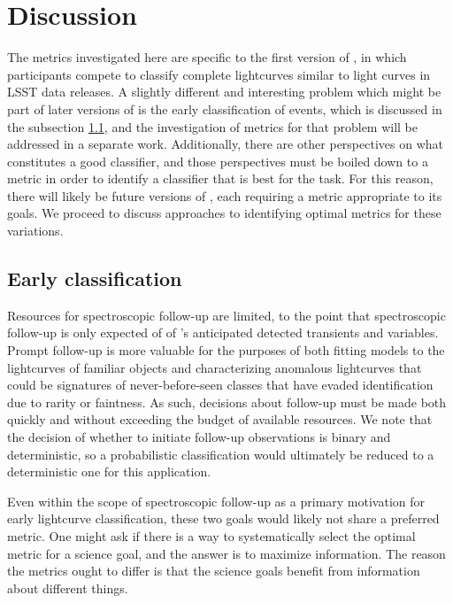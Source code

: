 \section{Discussion}
\label{sec:discussion}
The metrics investigated here are specific to the first version of \plasticc, in which participants compete to classify complete lightcurves similar to light curves in LSST data releases. A slightly different and interesting problem which might be part of later versions of \plasticc is the early classification of events, which is discussed in the subsection \ref{sec:early}, and the investigation of metrics for that problem will be addressed in a separate work.  
Additionally, there are other perspectives on what constitutes a good classifier, and those perspectives must be boiled down to a metric in order to identify a classifier that is best for the task.
For this reason, there will likely be future versions of \plasticc, each requiring a metric appropriate to its goals.
We proceed to discuss approaches to identifying optimal metrics for these variations.

\subsection{Early classification}
\label{sec:early}

Resources for spectroscopic follow-up are limited, to the point that spectroscopic follow-up is only expected of  of \lsst's anticipated  detected transients and variables.
Prompt follow-up is more valuable for the purposes of both fitting models to the lightcurves of familiar objects and characterizing anomalous lightcurves that could be signatures of never-before-seen classes that have evaded identification due to rarity or faintness.
As such, decisions about follow-up must be made both quickly and without exceeding the budget of available resources.
We note that the decision of whether to initiate follow-up observations is binary and deterministic, so a probabilistic classification would ultimately be reduced to a deterministic one for this application.

Even within the scope of spectroscopic follow-up as a primary motivation for early lightcurve classification, these two goals would likely not share a preferred metric.
One might ask if there is a way to systematically select the optimal metric for a science goal, and the answer is to maximize information.
The reason the metrics ought to differ is that the science goals benefit from information about different things.


